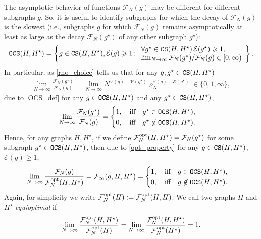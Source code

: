 \documentclass[11pt,reqno]{amsart}
\numberwithin{equation}{section}
\begin{document}
\begin{itemize}
{The asymptotic behavior of functions $\mathcal{F}_N(g)$ may be different for different subgraphs $g$. So, it is useful to identify subgraphs for which the decay of $\mathcal{F}_N(g)$ is the slowest {(i.e., subgraphs $g$ for which $\mathcal{F}_N(g)$ 
remains asymptotically at least as large as the decay $\mathcal{F}_N(g^\star)$ of any other subgraph $g^\star$)}:
\begin{align}
    {\tt OCS}({H},{H^{\star}}) = \left\{g\in{\tt CS}({H},{H^{\star})}, \mathcal{E}(g)\geqslant 1\colon \begin{array}{l}\forall g^{\star}\in{\tt CS}({H},{H^{\star}})\,\mathcal{E}(g^{\star})\geqslant 1,\\ \lim_{N\to\infty}\mathcal{F}_N(g^{\star})/\mathcal{F}_N(g)\in[0,\infty)
    \end{array}\right\}.\label{OCS_def}
\end{align}
In particular, {as \eqref{rho_choice} tells us that for any $g,g^{\star}\in {\tt CS}(H,H^{\star})$}
\begin{align*}
    {\lim_{N\to\infty}\frac{\mathcal{F}_N(g^{\star})}{\mathcal{F}_N(g)} = \lim_{N\to\infty}N^{\mathcal{V}(g) - \mathcal{V}(g^{\star})}\varrho_N^{\mathcal{E}(g) - \mathcal{E}(g^{\star})}\in\{0,1,\infty\} ,}   
\end{align*}
{due to \eqref{OCS_def}} for any $g\in{\tt OCS}({H},{H^{\star}})$ and any $g^{\star}\in{\tt CS}({H},{H^{\star}})$,
\begin{align}
    \lim_{N\to\infty}\frac{\mathcal{F}_N(g^{\star})}{\mathcal{F}_N(g)} = \begin{cases} 1,\quad \text{iff} \quad g^{\star}\in{\tt OCS}({H},{H^{\star}}),\\
        0,\quad \text{iff} \quad g^{\star}\not\in{\tt OCS}({H},{H^{\star}}).
    \end{cases}\label{opt_property}
\end{align}
Hence, for any graphs ${H},{H^{\star}}$, {if we define $\mathcal{F}^{\rm opt}_N({H},{H^{\star}}) = \mathcal{F}_N(g^{\star})$ for some subgraph} {\mbox{$g^{\star}\in{\tt OCS}(H,H^{\star})$},} {then due to \eqref{opt_property} for any} $g\in{\tt CS}({H},{H^{\star}})$, $\mathcal{E}(g)\geqslant 1$,
\begin{align}
    \lim_{N\to\infty}\frac{\mathcal{F}_N(g)}{\mathcal{F}^{\rm opt}_N({H},{H^{\star}})} = \mathcal{F}_{\infty}(g,{H},{H^{\star}}) =\begin{cases} 1,\quad \text{iff} \quad g\in{\tt OCS}({H},{H^{\star}}),\\
        0,\quad \text{iff} \quad g\not\in{\tt OCS}({H},{H^{\star}}).\label{F_cal_opt_def}
    \end{cases}
\end{align}
Again, for simplicity we write $\mathcal{F}^{\rm opt}_N({H}):=\mathcal{F}^{\rm opt}_N({H},{H})$.
We call two graphs $H$ and ${H^{\star}}$ {\it equioptimal} if
\begin{align} 
    \lim_{N\to\infty} \frac{\mathcal{F}_N^{\rm opt} ({H}, {H^{\star}})}{\mathcal{F}_N^{\rm opt} ({H})}=\lim_{N\to\infty} \frac{\mathcal{F}_N^{\rm opt} ({H}, {H^{\star}})}{\mathcal{F}_N^{\rm opt} ({H^{\star}} )}=1.\label{equioptimal}
\end{align} 

}
\end{itemize}
\end{document}
